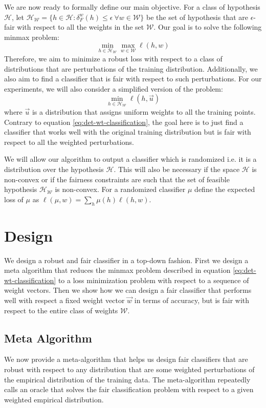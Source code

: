 \documentclass{article}
\newcommand{\set}[1]{\{#1\}}
\newcommand{\WW}{\mathcal{W}}
\newcommand{\HH}{\mathcal{H}}
\begin{document}
We are now ready to formally define our main objective. 
For a class of hypothesis $\HH$, let $\HH_{\WW} = \set{h \in \HH: \delta^w_F(h) \le \epsilon\ \forall w \in \WW}$ be the set of hypothesis that are $\epsilon$-fair with respect to all the weights in the set $\WW$.
Our goal is to solve the following minmax problem:
\begin{equation}\label{eq:det-wt-classification}
\min_{h \in {\HH}_{\WW} } \max_{w \in \WW} \ell(h,w) 
\end{equation}
Therefore, we aim to minimize a robust loss with respect to a class of distributions that are perturbations of the training distribution. Additionally, we also aim to find a classifier that is fair with respect to such perturbations. For our experiments, we will also consider a simplified version of the problem:
\begin{equation}\label{eq:wt-fair-orig}
\min_{h \in {\HH}_{\WW} }  \ell(h,\vec{u}) 
\end{equation}
where $\vec{u}$ is a distribution that assigns uniform weights to all the training points. Contrary to equation \ref{eq:det-wt-classification}, the goal here is to just find a classifier that works well with the original training distribution but is fair with respect to all the weighted perturbations.

We will allow our algorithm to output a classifier which is randomized i.e. it is a distribution over the hypothesis $\HH$. This will also be necessary if the space $\HH$ is non-convex or if the fairness constraints are such that the set of feasible hypothesis $\HH_{\WW}$ is non-convex. For a randomized classifier $\mu$ define the expected loss of $\mu$ as $\ell(\mu,w) = \sum_{h} \mu(h) \ell(h,w)$. 

\section{Design}
We design a robust and fair classifier in a top-down fashion. First we design a meta algorithm that reduces the minmax problem described in equation \ref{eq:det-wt-classification} to a loss minimization problem with respect to a sequence of weight vectors. Then we show how we can design a fair classifier that performs well with respect a fixed weight vector $\vec{w}$ in terms of accuracy, but is fair with respect to the entire class of weights $\WW$.

\subsection{Meta Algorithm}
We now  provide a meta-algorithm that helps us design  fair classifiers that are robust with respect to
any distribution that are some weighted perturbations of the empirical distribution of the training data. The meta-algorithm repeatedly calls an oracle that solves the fair classification problem with respect to a given weighted empirical distribution. 
\end{document}
